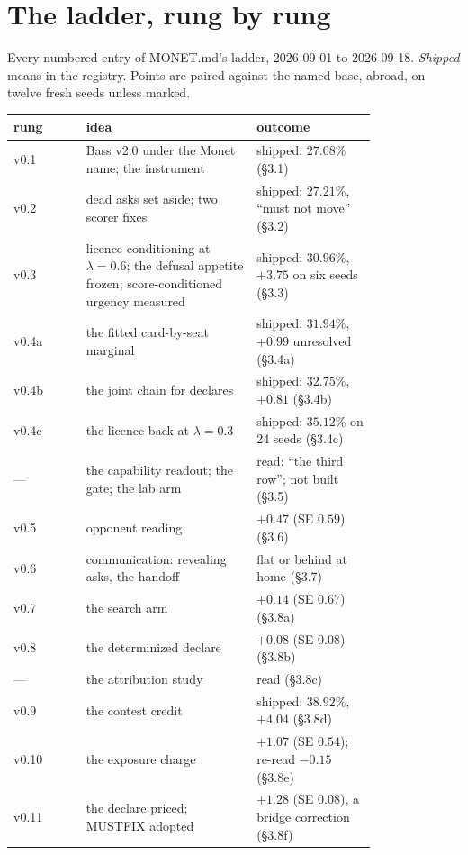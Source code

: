 \documentclass[11pt]{article}
\newcommand{\monet}{MONET.md}
\newcommand{\sect}[1]{\S#1}
\begin{document}
\appendix

\section{The ladder, rung by rung}
\label{app:ladder}

Every numbered entry of \monet{}'s ladder, 2026-09-01 to 2026-09-18. \emph{Shipped} means in the
registry. Points are paired against the named base, abroad, on twelve fresh seeds unless marked.

\begin{longtable}{@{}l>{\raggedright\arraybackslash}p{0.47\linewidth}>{\raggedright\arraybackslash}p{0.33\linewidth}@{}}
\toprule
rung & idea & outcome \\
\midrule
\endhead
v0.1 & Bass v2.0 under the Monet name; the instrument & shipped: $27.08\%$ (\sect{3.1}) \\
v0.2 & dead asks set aside; two scorer fixes & shipped: $27.21\%$, ``must not move'' (\sect{3.2}) \\
v0.3 & licence conditioning at $\lambda = 0.6$; the defusal appetite frozen; score-conditioned urgency measured & shipped: $30.96\%$, $+3.75$ on six seeds (\sect{3.3}) \\
v0.4a & the fitted card-by-seat marginal & shipped: $31.94\%$, $+0.99$ unresolved (\sect{3.4a}) \\
v0.4b & the joint chain for declares & shipped: $32.75\%$, $+0.81$ (\sect{3.4b}) \\
v0.4c & the licence back at $\lambda = 0.3$ & shipped: $35.12\%$ on 24 seeds (\sect{3.4c}) \\
--- & the capability readout; the gate; the lab arm & read; ``the third row''; not built (\sect{3.5}) \\
v0.5 & opponent reading & $+0.47$ (SE $0.59$) (\sect{3.6}) \\
v0.6 & communication: revealing asks, the handoff & flat or behind at home (\sect{3.7}) \\
v0.7 & the search arm & $+0.14$ (SE $0.67$) (\sect{3.8a}) \\
v0.8 & the determinized declare & $+0.08$ (SE $0.08$) (\sect{3.8b}) \\
--- & the attribution study & read (\sect{3.8c}) \\
v0.9 & the contest credit & shipped: $38.92\%$, $+4.04$ (\sect{3.8d}) \\
v0.10 & the exposure charge & $+1.07$ (SE $0.54$); re-read $-0.15$ (\sect{3.8e}) \\
v0.11 & the declare priced; MUSTFIX adopted & $+1.28$ (SE $0.08$), a bridge correction (\sect{3.8f}) \\

\end{longtable}
\end{document}
